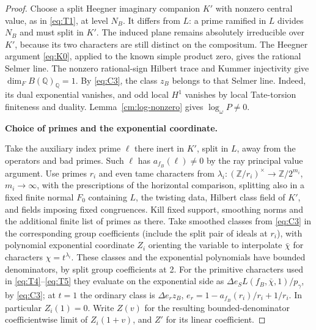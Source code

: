 \begin{proof}
Choose a split Heegner imaginary companion \(K'\) with nonzero
central value, as in \eqref{eq:T1}, at level \(N_B\).
It differs from \(L\): a prime ramified in \(L\) divides \(N_B\)
and must split in \(K'\). The induced plane remains absolutely
irreducible over \(K'\), because its two characters are still distinct
on the compositum. The Heegner argument \eqref{eq:K0}, applied to the
known simple product zero, gives the rational Selmer line.
The nonzero rational-sign Hilbert trace and Kummer injectivity give
\(\dim_F B(\mathbb Q)_{\mathbb Q}=1\).
By \eqref{eq:C3}, the class \(z_B\) belongs to that Selmer line.
Indeed, its dual exponential vanishes, and odd local \(H^1\)
vanishes by local Tate-torsion finiteness and duality.
Lemma~\ref{cm:log-nonzero} gives \(\log_\omega P\ne0\).

\par\smallskip\noindent{}\label{cm:construction:exponential}%
\textbf{Choice of primes and the exponential coordinate.}\enspace

Take the auxiliary index prime \(\ell\) there inert in \(K'\), split in \(L\), away from the
operators and bad primes. Such \(\ell\) has \(a_{f_B}(\ell)\ne0\) by the ray principal value
argument. Use primes \(r_i\) and even tame characters from \(\lambda_i:(\mathbb
Z/r_i)^\times\to\mathbb Z/2^{m_i}\), \(m_i\to\infty\), with the prescriptions of the
horizontal comparison, splitting also in a fixed finite normal \(F_0\) containing \(L\), the
twisting data, Hilbert class field of \(K'\), and fields imposing fixed congruences. Kill
fixed support, smoothing norms and the additional finite list of primes as there. Take
smoothed classes from \eqref{eq:C3} in the corresponding group coefficients (include the split
pair of ideals at \(r_i\)), with polynomial exponential coordinate \(Z_i\) orienting the
variable to interpolate \(\bar\chi\) for characters \(\chi=t^{\lambda_i}\). These classes and
the exponential polynomials have bounded denominators, by split group coefficients at 2. For
the primitive characters used in \eqref{eq:T4}–\eqref{eq:T5} they evaluate on the exponential
side as
\(\Delta e_S L(f_B,\bar\chi,1)/p_\gamma\), by \eqref{eq:C3}; at \(t=1\) the ordinary class is
\(\Delta e_r z_B\), \(e_r=1-a_{f_B}(r_i)/r_i+1/r_i\). In particular \(Z_i(1)=0\).
Write \(Z(v)\) for the resulting bounded-denominator coefficientwise limit of
\(Z_i(1+v)\), and \(Z'\) for its linear coefficient.


\end{proof}
